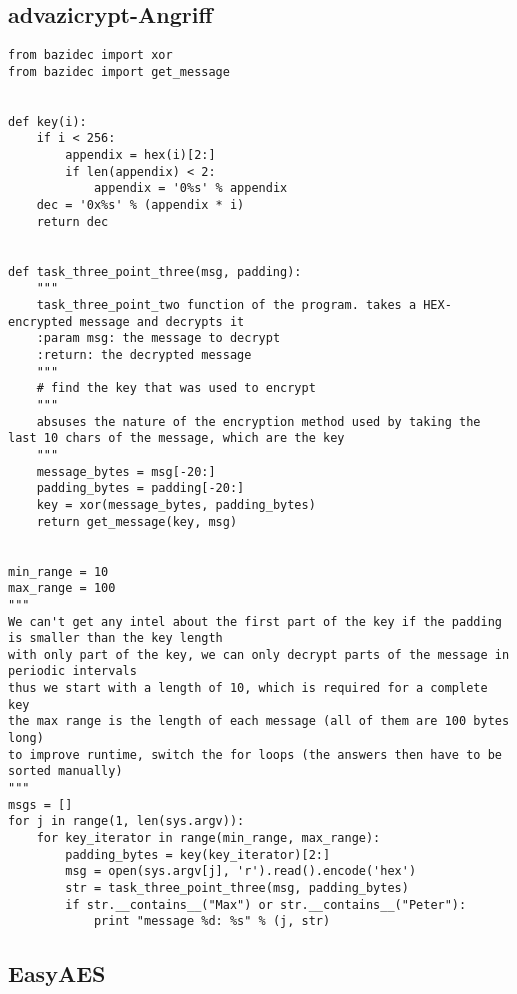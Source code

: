 \documentclass[twoside]{article}
\begin{document}
	\subsection*{advazicrypt-Angriff}
		\label{advazicrypt}
		\begin{lstlisting}
from bazidec import xor
from bazidec import get_message


def key(i):
    if i < 256:
        appendix = hex(i)[2:]
        if len(appendix) < 2:
            appendix = '0%s' % appendix
    dec = '0x%s' % (appendix * i)
    return dec


def task_three_point_three(msg, padding):
    """
    task_three_point_two function of the program. takes a HEX-encrypted message and decrypts it
    :param msg: the message to decrypt
    :return: the decrypted message
    """
    # find the key that was used to encrypt
    """
    absuses the nature of the encryption method used by taking the last 10 chars of the message, which are the key
    """
    message_bytes = msg[-20:]
    padding_bytes = padding[-20:]
    key = xor(message_bytes, padding_bytes)
    return get_message(key, msg)


min_range = 10
max_range = 100
"""
We can't get any intel about the first part of the key if the padding is smaller than the key length
with only part of the key, we can only decrypt parts of the message in periodic intervals
thus we start with a length of 10, which is required for a complete key
the max range is the length of each message (all of them are 100 bytes long)
to improve runtime, switch the for loops (the answers then have to be sorted manually)
"""
msgs = []
for j in range(1, len(sys.argv)):
    for key_iterator in range(min_range, max_range):
        padding_bytes = key(key_iterator)[2:]
        msg = open(sys.argv[j], 'r').read().encode('hex')
        str = task_three_point_three(msg, padding_bytes)
        if str.__contains__("Max") or str.__contains__("Peter"):
            print "message %d: %s" % (j, str)

		\end{lstlisting}
		
	\subsection*{EasyAES}
		\label{AES}
\end{document}
